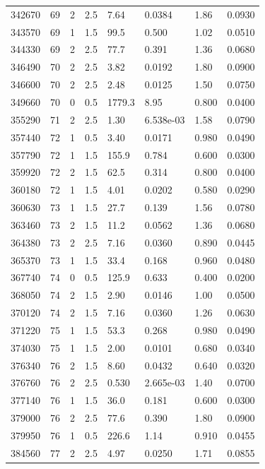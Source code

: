 \documentclass[preview]{standalone}
\begin{document}
{{{{{{\begin{tabular}{L{1.2cm}C{1.2cm} C{0.3cm}C{0.5cm} C{1.4cm}C{1.4cm} C{1.4cm}C{1.4cm}}
  342670  &    69  & 2     & 2.5 &  7.64  & 0.0384  & 1.86 &  0.0930   \\ 
  343570  &    69  & 1     & 1.5 &  99.5  & 0.500  & 1.02 &  0.0510   \\ 
  344330  &    69  & 2     & 2.5 &  77.7  & 0.391  & 1.36 &  0.0680   \\ 
  346490  &    70  & 2     & 2.5 &  3.82  & 0.0192  & 1.80 &  0.0900   \\ 
  346600  &    70  & 2     & 2.5 &  2.48  & 0.0125  & 1.50 &  0.0750   \\ 
  349660  &    70  & 0     & 0.5 &  1779.3  & 8.95  & 0.800 &  0.0400   \\ 
  355290  &    71  & 2     & 2.5 &  1.30  & 6.538e-03  & 1.58 &  0.0790   \\ 
  357440  &    72  & 1     & 0.5 &  3.40  & 0.0171  & 0.980 &  0.0490   \\ 
  357790  &    72  & 1     & 1.5 &  155.9  & 0.784  & 0.600 &  0.0300   \\ 
  359920  &    72  & 2     & 1.5 &  62.5  & 0.314  & 0.800 &  0.0400   \\ 
  360180  &    72  & 1     & 1.5 &  4.01  & 0.0202  & 0.580 &  0.0290   \\ 
  360630  &    73  & 1     & 1.5 &  27.7  & 0.139  & 1.56 &  0.0780   \\ 
  363460  &    73  & 2     & 1.5 &  11.2  & 0.0562  & 1.36 &  0.0680   \\ 
  364380  &    73  & 2     & 2.5 &  7.16  & 0.0360  & 0.890 &  0.0445   \\ 
  365370  &    73  & 1     & 1.5 &  33.4  & 0.168  & 0.960 &  0.0480   \\ 
  367740  &    74  & 0     & 0.5 &  125.9  & 0.633  & 0.400 &  0.0200   \\ 
  368050  &    74  & 2     & 1.5 &  2.90  & 0.0146  & 1.00 &  0.0500   \\ 
  370120  &    74  & 2     & 1.5 &  7.16  & 0.0360  & 1.26 &  0.0630   \\ 
  371220  &    75  & 1     & 1.5 &  53.3  & 0.268  & 0.980 &  0.0490   \\ 
  374030  &    75  & 1     & 1.5 &  2.00  & 0.0101  & 0.680 &  0.0340   \\ 
  376340  &    76  & 2     & 1.5 &  8.60  & 0.0432  & 0.640 &  0.0320   \\ 
  376760  &    76  & 2     & 2.5 &  0.530  & 2.665e-03  & 1.40 &  0.0700   \\ 
  377140  &    76  & 1     & 1.5 &  36.0  & 0.181  & 0.600 &  0.0300   \\ 
  379000  &    76  & 2     & 2.5 &  77.6  & 0.390  & 1.80 &  0.0900   \\ 
  379950  &    76  & 1     & 0.5 &  226.6  & 1.14  & 0.910 &  0.0455   \\ 
  384560  &    77  & 2     & 2.5 &  4.97  & 0.0250  & 1.71 &  0.0855   \\ 
\hline 
\end{tabular} 

}}}}}}
\end{document}
